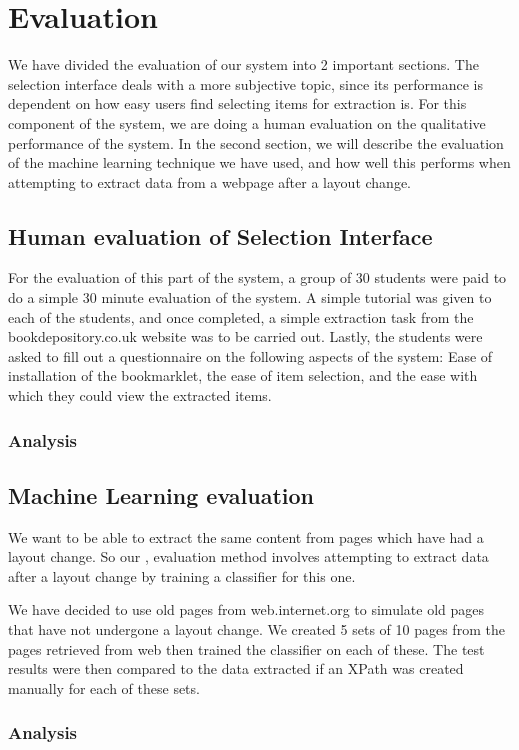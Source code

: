 \chapter{Evaluation}
\label{chap:evaluation}
We have divided the evaluation of our system into 2 important sections. The selection interface
deals with a more subjective topic, since its performance is dependent on how easy users find 
selecting items for extraction is. For this component of the system, we are doing a human
evaluation on the qualitative performance of the system. In the second section, we will describe
the evaluation of the machine learning technique we have used, and how well this performs when
attempting to extract data from a webpage after a layout change.

\section{Human evaluation of Selection Interface}

For the evaluation of this part of the system, a group of 30 students were paid to do a simple 30
minute evaluation of the system. A simple tutorial was given to each of the students, and once
completed, a simple extraction task from the bookdepository.co.uk website was to be carried out.
Lastly, the students were asked to fill out a questionnaire on the following aspects of the
system: Ease of installation of the bookmarklet, the ease of item selection, and the ease with
which they could view the extracted items.
\subsection{Analysis}

\section{Machine Learning evaluation}
 We want to be able to extract the same content from pages which have had a layout change. So our
 , evaluation method involves attempting to extract data after a layout change by training a
 classifier for this one.
 
 We have decided to use old pages from web.internet.org to simulate old pages that have not
 undergone 
 a layout change. We created 5 sets of 10 pages from the pages retrieved from web then trained 
 the classifier on each of these. The test results were then compared to the data extracted if an
 XPath was created manually for each of these sets.
\subsection{Analysis} 